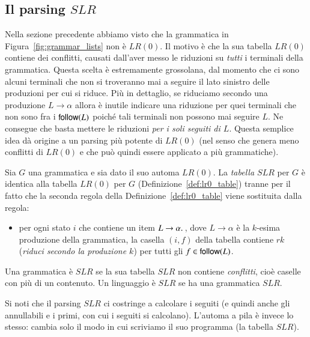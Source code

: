 \subsection{Il parsing $\mathit{SLR}$}\label{subsec:slr}
%
Nella sezione precedente abbiamo visto che la grammatica in
Figura~\ref{fig:grammar_lists} non \`e $\mathit{LR}(0)$. Il motivo \`e che
la sua tabella $\mathit{LR}(0)$
contiene dei conflitti, causati dall'aver messo le
riduzioni su \emph{tutti} i terminali della grammatica.
Questa scelta \`e estremamente
grossolana, dal momento che ci sono alcuni terminali che non si troveranno
mai a seguire il lato sinistro delle produzioni per cui si riduce.
Pi\`u in dettaglio, se riduciamo secondo una produzione
$L\to\alpha$ allora \`e inutile indicare una riduzione per quei terminali che
non sono fra i $\mathsf{follow}(L)$ poich\'e tali terminali non possono mai seguire
$L$. Ne consegue che basta mettere le riduzioni
\emph{per i soli seguiti di $L$}. Questa semplice idea d\`a origine
a un parsing pi\`u potente di $\mathit{LR}(0)$
(nel senso che genera meno conflitti
di $\mathit{LR}(0)$ e che pu\`o quindi essere applicato a pi\`u grammatiche).
%
\begin{definition}\label{def:slr_table}
Sia $G$ una grammatica e sia dato il suo automa $\mathit{LR}(0)$.
La \emph{tabella $\mathit{SLR}$} per $G$ \`e identica alla tabella
$\mathit{LR}(0)$
per $G$ (Definizione~\ref{def:lr0_table}) tranne per il fatto che la seconda
regola della Definizione~\ref{def:lr0_table} viene sostituita dalla regola:
\begin{itemize}
\item per ogni stato $i$ che contiene un item $L\to\alpha.\,$, dove
      $L\to\alpha$ \`e la $k$-esima produzione della grammatica, la casella
      $(i,f)$ della tabella contiene $rk$
      (\emph{riduci secondo la produzione $k$}) per tutti gli
      $f\in\mathsf{follow}(L)$.
\end{itemize}
\end{definition}
%
\begin{definition}\label{def:slr_grammar}
Una grammatica \`e $\mathit{SLR}$ se la sua tabella $\mathit{SLR}$ non contiene
\emph{conflitti},
cio\`e caselle con pi\`u di un contenuto. Un linguaggio \`e $\mathit{SLR}$ se
ha una grammatica $\mathit{SLR}$.
\end{definition}
%
\noindent
Si noti che il parsing $\mathit{SLR}$ ci costringe a calcolare i seguiti
(e quindi anche gli annullabili e i primi, con cui i seguiti si
calcolano). L'automa a pila \`e invece lo stesso: cambia solo il modo
in cui scriviamo il suo programma (la tabella $\mathit{SLR}$).

